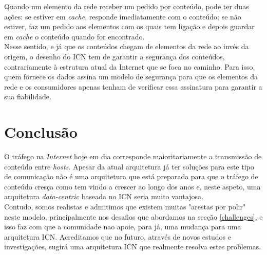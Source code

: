 \documentclass[conference]{IEEEtran}
\begin{document}
Quando um elemento da rede receber um pedido por conte\'{u}do, pode ter duas a\c{c}\~{o}es: se estiver em \textit{cache}, responde imediatamente com o conte\'{u}do; se n\~{a}o estiver, faz um pedido aos elementos com os quais tem liga\c{c}\~{a}o e depois guardar em \textit{cache} o conte\'{u}do quando for encontrado\cite{surveyICN}.\\

Nesse sentido, e j\'{a} que os conte\'{u}dos chegam de elementos da rede ao inv\'{e}s da origem, o desenho do ICN tem de garantir a seguran\c{c}a dos conte\'{u}dos, contrariamente \`{a} estrutura atual da Internet que se foca no caminho. Para isso, quem fornece os dados assina um modelo de seguran\c{c}a para que os elementos da rede e os consumidores apenas tenham de verificar essa assinatura para garantir a sua fiabilidade\cite{icnForest}.\\

\section{Conclus\~{a}o}

O tráfego na \textit{Internet} hoje em dia corresponde maioritariamente a transmissão de conteúdo entre \textit{hosts}. Apesar da atual arquitetura já ter soluções para este tipo de comunicação não é uma arquitetura que está preparada para que o tráfego de conteúdo cresça como tem vindo a crescer ao longo dos anos e, neste aspeto, uma arquitetura \textit{data-centric} baseada no ICN seria muito vantajosa.\\

Contudo, somos realistas e admitimos que existem muitas "arestas por polir" neste modelo, principalmente nos desafios que abordamos na secção \ref{challenges}, e isso faz com que a comunidade nao apoie, para já, uma mudança para uma arquitetura ICN. Acreditamos que no futuro, através de novos estudos e investigações, sugirá uma arquitetura ICN que realmente resolva estes problemas. 



\end{document}
